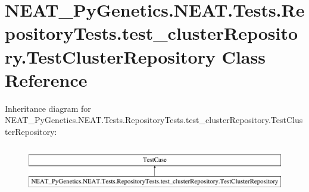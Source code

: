 \hypertarget{classNEAT__PyGenetics_1_1NEAT_1_1Tests_1_1RepositoryTests_1_1test__clusterRepository_1_1TestClusterRepository}{}\section{N\+E\+A\+T\+\_\+\+Py\+Genetics.\+N\+E\+A\+T.\+Tests.\+Repository\+Tests.\+test\+\_\+cluster\+Repository.\+Test\+Cluster\+Repository Class Reference}
\label{classNEAT__PyGenetics_1_1NEAT_1_1Tests_1_1RepositoryTests_1_1test__clusterRepository_1_1TestClusterRepository}
Inheritance diagram for N\+E\+A\+T\+\_\+\+Py\+Genetics.\+N\+E\+A\+T.\+Tests.\+Repository\+Tests.\+test\+\_\+cluster\+Repository.\+Test\+Cluster\+Repository\+:\begin{figure}[H]
\begin{center}
\leavevmode
\includegraphics[height=2.000000cm]{classNEAT__PyGenetics_1_1NEAT_1_1Tests_1_1RepositoryTests_1_1test__clusterRepository_1_1TestClusterRepository}
\end{center}
\end{figure}
